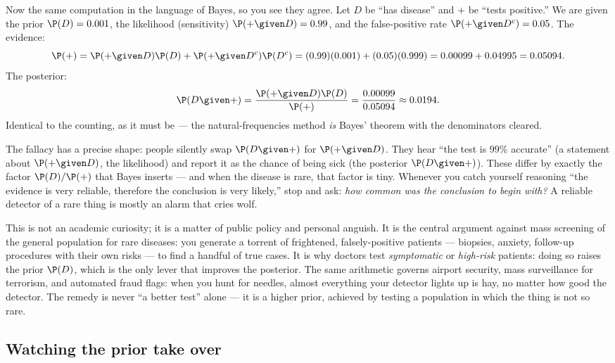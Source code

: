 Now the same computation in the language of Bayes, so you see they agree. Let $D$ be
``has disease'' and $+$ be ``tests positive.'' We are given the prior $\P(D) = 0.001$,
the likelihood (sensitivity) $\P(+ \given D) = 0.99$, and the false-positive rate
$\P(+ \given D^c) = 0.05$. The evidence:
\[
  \P(+) = \P(+\given D)\P(D) + \P(+\given D^c)\P(D^c)
        = (0.99)(0.001) + (0.05)(0.999)
        = 0.00099 + 0.04995 = 0.05094.
\]
The posterior:
\[
  \P(D \given +) = \frac{\P(+\given D)\P(D)}{\P(+)}
                 = \frac{0.00099}{0.05094} \approx 0.0194.
\]
Identical to the counting, as it must be --- the natural-frequencies method \emph{is}
Bayes' theorem with the denominators cleared.

\begin{trapbox}
The fallacy has a precise shape: people silently swap $\P(D \given +)$ for
$\P(+ \given D)$. They hear ``the test is $99\%$ accurate'' (a statement about
$\P(+\given D)$, the likelihood) and report it as the chance of being sick (the
posterior $\P(D\given +)$). These differ by exactly the factor $\P(D)/\P(+)$ that Bayes
inserts --- and when the disease is rare, that factor is tiny. Whenever you catch
yourself reasoning ``the evidence is very reliable, therefore the conclusion is very
likely,'' stop and ask: \emph{how common was the conclusion to begin with?} A reliable
detector of a rare thing is mostly an alarm that cries wolf.
\end{trapbox}

\begin{aestheticbox}
This is not an academic curiosity; it is a matter of public policy and personal anguish.
It is the central argument against mass screening of the general population for rare
diseases: you generate a torrent of frightened, falsely-positive patients --- biopsies,
anxiety, follow-up procedures with their own risks --- to find a handful of true cases.
It is why doctors test \emph{symptomatic} or \emph{high-risk} patients: doing so raises
the prior $\P(D)$, which is the only lever that improves the posterior. The same
arithmetic governs airport security, mass surveillance for terrorism, and automated fraud
flags: when you hunt for needles, almost everything your detector lights up is hay, no
matter how good the detector. The remedy is never ``a better test'' alone --- it is a
higher prior, achieved by testing a population in which the thing is not so rare.
\end{aestheticbox}

\subsection{Watching the prior take over}

